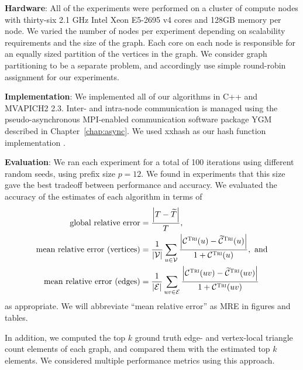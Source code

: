 \documentclass[10]{article}
\newcommand{\algoname}[1]{\textnormal{\textsc{#1}}}
\begin{document}
\noindent
\textbf{Hardware}: 
All of the experiments were performed on a cluster of compute nodes with thirty-six 2.1 GHz Intel Xeon E5-2695 v4 cores and 128GB memory per node. 
We varied the number of nodes per experiment depending on scalability requirements and the size of the graph.
Each core on each node is responsible for an equally sized partition of the vertices in the graph.
We consider graph partitioning to be a separate problem, and accordingly use simple round-robin assignment for our experiments.

\noindent
\textbf{Implementation}:
We implemented all of our algorithms in C++ and MVAPICH2 2.3. 
Inter- and intra-node communication is managed using the pseudo-asynchronous MPI-enabled communication software package YGM described in Chapter~\ref{chap:async}.
We used xxhash as our hash function implementation \cite{xxhash}. 

\noindent
\textbf{Evaluation}:
We ran each experiment for a total of 100 iterations using different random seeds, using prefix size $p = 12$. 
We found in experiments that this size gave the best tradeoff between performance and accuracy.
We evaluated the accuracy of the estimates of each algorithm in terms of 
%
\begin{align}
\label{eq:global_error}
\text{global relative error} &= \frac{ \left | T - \widetilde{T} \right |}{T}, \\
\label{eq:vertex_mre}
\text{mean relative error (vertices)} &= \frac{1}{|\mathcal{V}|} \sum_{u \in \mathcal{V}} \frac{\left | \mathcal{C}^{\algoname{Tri}}(u) - \widetilde{\mathcal{C}}^{\algoname{Tri}}(u) \right |}{1 + \mathcal{C}^{\algoname{Tri}}(u)}, \text{ and} \\
\label{eq:edge_mre}
\text{mean relative error (edges)} &= \frac{1}{|\mathcal{E}|} \sum_{uv \in \mathcal{E}} \frac{\left | \mathcal{C}^{\algoname{Tri}}(uv) - \widetilde{\mathcal{C}}^{\algoname{Tri}}(uv) \right |}{1 + \mathcal{C}^{\algoname{Tri}}(uv)}
\end{align}
%
as appropriate.
We will abbreviate ``mean relative error'' as MRE in figures and tables.

In addition, we computed the top $k$ ground truth edge- and vertex-local triangle count elements of each graph, and compared them with the estimated top $k$ elements. 
We considered multiple performance metrics using this approach.
\end{document}
